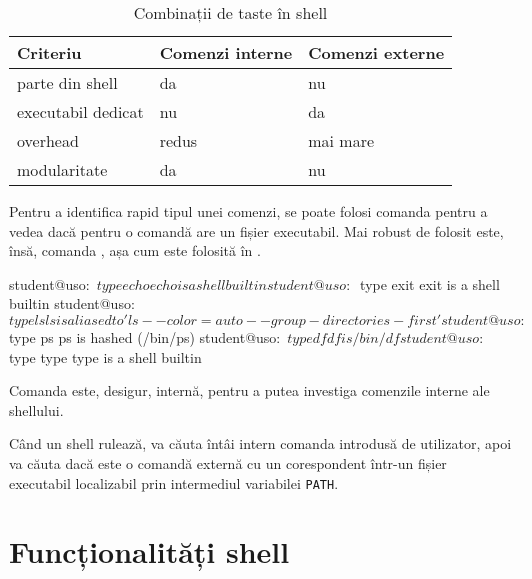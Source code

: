 \begin{table}[!htb]
  \caption{Combinații de taste în shell}
  \begin{center}
    \begin{tabular}{ p{} p{} p{} }
      \toprule
        \textbf{Criteriu} &
        \textbf{Comenzi interne} &
        \textbf{Comenzi externe} \\
      \midrule
        parte din shell &
        da &
        nu \\

        executabil dedicat &
        nu &
        da \\

        overhead &
        redus &
        mai mare \\

        modularitate &
        da &
        nu \\
      \bottomrule
    \end{tabular}
    \label{tab:cli:internal-vs-external}
  \end{center}
\end{table}

Pentru a identifica rapid tipul unei comenzi, se poate folosi comanda 
pentru a vedea dacă pentru o comandă are un fișier executabil. Mai robust de
folosit este, însă, comanda , așa cum este folosită în .

\begin{screen}[caption={Tipul unei comenzi (type)},label={lst:cli:type}]
student@uso:~$ type echo
echo is a shell builtin
student@uso:~$ type exit
exit is a shell builtin
student@uso:~$ type ls
ls is aliased to 'ls --color=auto --group-directories-first'
student@uso:~$ type ps
ps is hashed (/bin/ps)
student@uso:~$ type df
df is /bin/df
student@uso:~$ type type
type is a shell builtin
\end{screen}

Comanda  este, desigur, internă, pentru a putea investiga comenzile interne
ale shellului.

Când un shell rulează, va căuta întâi intern comanda introdusă de utilizator,
apoi va căuta dacă este o comandă externă cu un corespondent într-un fișier
executabil localizabil prin intermediul variabilei \texttt{PATH}.

\section{Funcționalități shell}
\label{sec:cli:shell-func}

